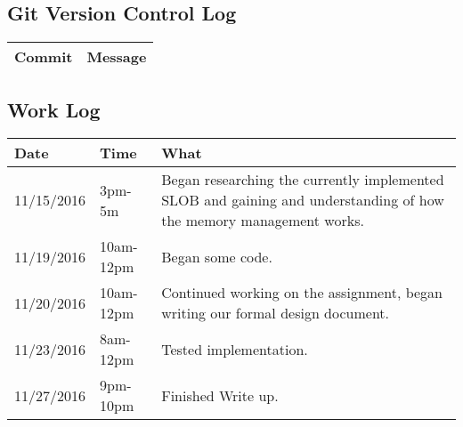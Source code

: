 \documentclass[letterpaper,10pt,titlepage]{article}
\begin{document}
\subsection {Git Version Control Log}
\begin{tabular}{ |p{10cm}|p{3cm}| } 
 \hline
 Commit & Message \\
 \hline


\hline

\end{tabular}

\subsection{Work Log}
\begin{tabular}{ |p{3cm}|p{3cm}|p{5cm}| } 
\hline
Date & Time & What \\
\hline
11/15/2016& 3pm-5m& Began researching the currently implemented SLOB and gaining and understanding of how the memory management works. \\
 \hline
 11/19/2016& 10am-12pm& Began some code. \\
 \hline
 11/20/2016& 10am-12pm & Continued working on the assignment, began writing our formal design document.\\
 \hline
 11/23/2016& 8am-12pm & Tested implementation.\\
 \hline
 11/27/2016& 9pm-10pm & Finished Write up.\\
 \hline
\end{tabular}
\end{document}
